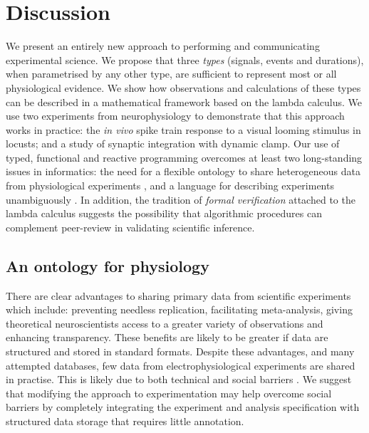 \section*{Discussion}

We present an entirely new approach to performing and communicating
experimental science. We propose that three \emph{types} (signals, events and
durations), when parametrised by any other type, are sufficient to
represent most or all physiological evidence. We show how observations
and calculations of these types can be described in a mathematical
framework based on the lambda calculus. We use two experiments from
neurophysiology to demonstrate that this approach works in practice:
the \emph{in vivo} spike train response to a visual looming stimulus
in locusts; and a study of synaptic integration with dynamic
clamp. Our use of typed, functional and reactive programming overcomes
at least two long-standing issues in informatics: the need for a
flexible ontology to share heterogeneous data from physiological
experiments \citep{Amari2002}, and a language for describing
experiments unambiguously \citep{Murray-Rust2002}. In addition, the
tradition of \emph{formal verification} attached to the lambda
calculus suggests the possibility that algorithmic procedures can
complement peer-review in validating scientific inference.

\subsection*{An ontology for physiology}

There are clear advantages to sharing primary data from scientific
experiments \citep{Insel2003} which include: preventing needless replication,
facilitating meta-analysis, giving theoretical neuroscientists access
to a greater variety of observations and enhancing transparency. These
benefits are likely to be greater if data are structured and stored in
standard formats. Despite these advantages, and many attempted
databases, few data from electrophysiological experiments are
shared in practise. This is likely due to both technical and social
barriers \citep{Amari2002}. We suggest that modifying the approach to
experimentation may help overcome social barriers by completely
integrating the experiment and analysis specification with structured
data storage that requires little annotation.

